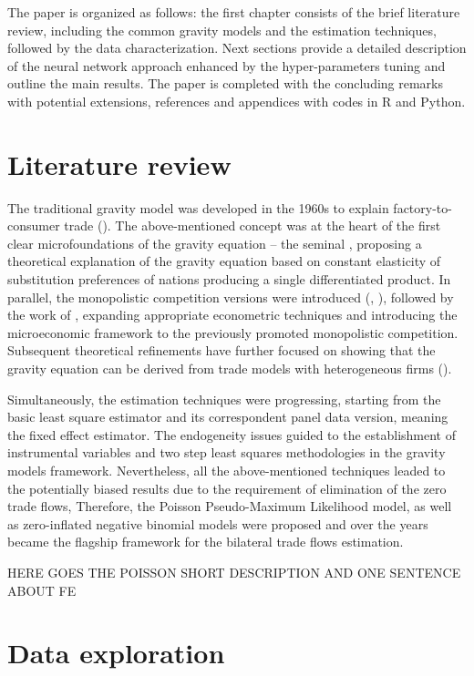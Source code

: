 \documentclass{Trade_template}
\numberwithin{equation}{section}
\begin{document}
The paper is organized as follows: the first chapter consists of the brief literature review, including the common gravity models and the estimation techniques, followed by the data characterization. Next sections provide a detailed description of the neural network approach enhanced by the hyper-parameters tuning and outline the main results. The paper is completed with the concluding remarks with potential extensions, references and appendices with codes in R and Python.

\chapter{Literature review}

The traditional gravity model was developed in the 1960s to explain factory-to-consumer trade (\citet{tinbergen1962analysis}). The above-mentioned concept was at the heart of the first clear microfoundations of the gravity equation – the seminal \citet{anderson1979theoretical}, proposing a theoretical explanation of the gravity equation based on constant elasticity of substitution preferences of nations producing a single differentiated product. In parallel, the monopolistic competition versions were introduced (\citet{krugman1980scale}, \citet{bergstrand1985gravity}), followed by the work of \citet{anderson2003gravity}, expanding appropriate econometric techniques and introducing the microeconomic framework to the previously promoted monopolistic competition. Subsequent theoretical refinements have further focused on showing that the gravity equation can be derived from trade models with heterogeneous firms (\citet{helpman2008estimating}).

Simultaneously, the estimation techniques were progressing, starting from the basic least square estimator and its correspondent panel data version, meaning the fixed effect estimator. The endogeneity issues guided to the establishment of instrumental variables and two step least squares methodologies in the gravity models framework. Nevertheless, all the above-mentioned techniques leaded to the potentially biased results due to the requirement of elimination of the zero trade flows, Therefore, the Poisson Pseudo-Maximum Likelihood model, as well as zero-inflated negative binomial models were proposed and over the years became the flagship framework for the bilateral trade flows estimation.

HERE GOES THE POISSON SHORT DESCRIPTION AND ONE SENTENCE ABOUT FE

\chapter{Data exploration}
\end{document}
